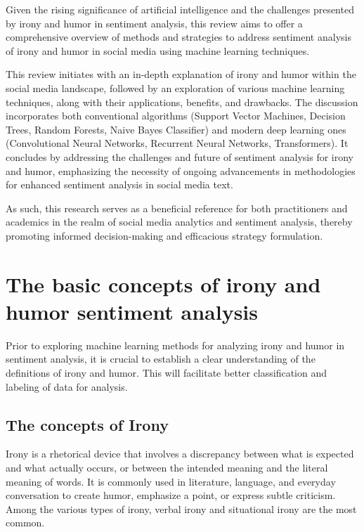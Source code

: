 \documentclass[a4paper]{article}
\begin{document}
Given the rising significance of artificial intelligence and the challenges presented by irony and humor in sentiment analysis, this review aims to offer a comprehensive overview of methods and strategies to address sentiment analysis of irony and humor in social media using machine learning techniques. 

This review initiates with an in-depth explanation of irony and humor within the social media landscape, followed by an exploration of various machine learning techniques, along with their applications, benefits, and drawbacks. The discussion incorporates both conventional algorithms (Support Vector Machines, Decision Trees, Random Forests, Naive Bayes Classifier) and modern deep learning ones (Convolutional Neural Networks, Recurrent Neural Networks, Transformers). It concludes by addressing the challenges and future of sentiment analysis for irony and humor, emphasizing the necessity of ongoing advancements in methodologies for enhanced sentiment analysis in social media text.

As such, this research serves as a beneficial reference for both practitioners and academics in the realm of social media analytics and sentiment analysis, thereby promoting informed decision-making and efficacious strategy formulation.

\section{The basic concepts of irony and humor sentiment analysis}

Prior to exploring machine learning methods for analyzing irony and humor in sentiment analysis, it is crucial to establish a clear understanding of the definitions of irony and humor. This will facilitate better classification and labeling of data for analysis.

\subsection{The concepts of Irony}

Irony is a rhetorical device that involves a discrepancy between what is expected and what actually occurs, or between the intended meaning and the literal meaning of words. It is commonly used in literature, language, and everyday conversation to create humor, emphasize a point, or express subtle criticism. Among the various types of irony, verbal irony and situational irony are the most common.\cite{ref_concept1,ref_concept2}
\end{document}
